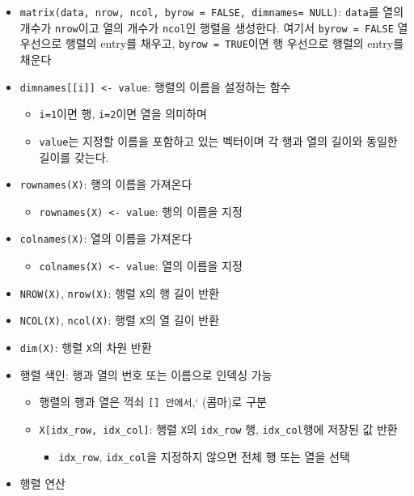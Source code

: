 \documentclass[11pt,a4paper]{book}
\providecommand{\tightlist}{%
  \setlength{\itemsep}{0pt}\setlength{\parskip}{0pt}}
\theoremstyle{definition}
\theoremstyle{definition}
\theoremstyle{definition}
\theoremstyle{remark}
\begin{document}
\begin{itemize}
\tightlist
\item
  \texttt{matrix(data,\ nrow,\ ncol,\ byrow\ =\ FALSE,\ dimnames=\ NULL)}:
  \texttt{data}를 열의 개수가 \texttt{nrow}이고 열의 개수가
  \texttt{ncol}인 행렬을 생성한다. 여기서 \texttt{byrow\ =\ FALSE} 열
  우선으로 행렬의 entry를 채우고, \texttt{byrow\ =\ TRUE}이면 행
  우선으로 행렬의 entry를 채운다
\item
  \texttt{dimnames{[}{[}i{]}{]}\ \textless{}-\ value}: 행렬의 이름을
  설정하는 함수

  \begin{itemize}
  \tightlist
  \item
    \texttt{i=1}이면 행, \texttt{i=2}이면 열을 의미하며
  \item
    \texttt{value}는 지정할 이름을 포함하고 있는 벡터이며 각 행과 열의
    길이와 동일한 길이를 갖는다.
  \end{itemize}
\item
  \texttt{rownames(X)}: 행의 이름을 가져온다

  \begin{itemize}
  \tightlist
  \item
    \texttt{rownames(X)\ \textless{}-\ value}: 행의 이름을 지정
  \end{itemize}
\item
  \texttt{colnames(X)}: 열의 이름을 가져온다

  \begin{itemize}
  \tightlist
  \item
    \texttt{colnames(X)\ \textless{}-\ value}: 열의 이름을 지정
  \end{itemize}
\item
  \texttt{NROW(X)}, \texttt{nrow(X)}: 행렬 \texttt{X}의 행 길이 반환
\item
  \texttt{NCOL(X)}, \texttt{ncol(X)}: 행렬 \texttt{X}의 열 길이 반환
\item
  \texttt{dim(X)}: 행렬 \texttt{X}의 차원 반환
\item
  행렬 색인: 행과 열의 번호 또는 이름으로 인덱싱 가능

  \begin{itemize}
  \tightlist
  \item
    행렬의 행과 열은 꺽쇠 \texttt{{[}{]}\textquotesingle{}\ 안에서},`
    (콤마)로 구분
  \item
    \texttt{X{[}idx\_row,\ idx\_col{]}}: 행렬 \texttt{X}의
    \texttt{idx\_row} 행, \texttt{idx\_col}행에 저장된 값 반환

    \begin{itemize}
    \tightlist
    \item
      \texttt{idx\_row}, \texttt{idx\_col}을 지정하지 않으면 전체 행
      또는 열을 선택
    \end{itemize}
  \end{itemize}
\item
  행렬 연산


\end{itemize}
\end{document}
